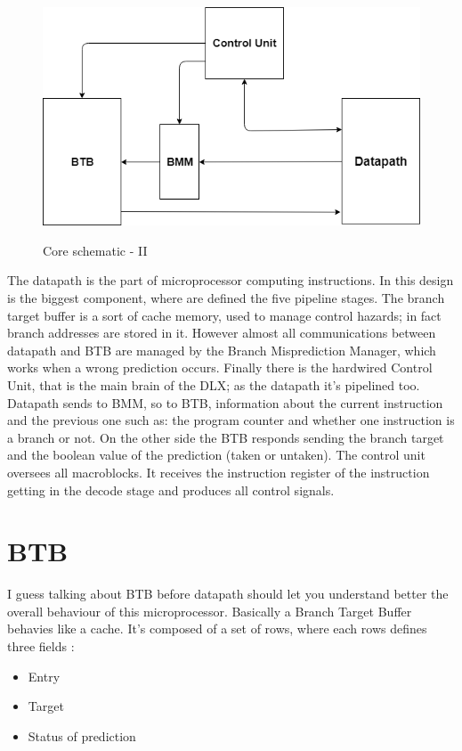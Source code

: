 \begin{figure}[H]
\centering
\includegraphics[scale=.6]{Immagini/07}
\label{02}
\caption{Core schematic - II}
\end{figure}
The datapath is the part of microprocessor computing instructions. In this design is the biggest component, where are defined the five pipeline stages. The branch target buffer is a sort of cache memory, used to manage control hazards; in fact branch addresses are stored in it. However almost all communications between datapath and BTB are managed by the Branch Misprediction Manager, which works when a wrong prediction occurs. Finally there is the hardwired Control Unit, that is the main brain of the DLX; as the datapath it's pipelined too.\newline
Datapath sends to BMM, so to BTB, information about the current instruction and the previous one such as: the program counter and whether one instruction is a branch or not. On the other side the BTB responds sending the branch target and the boolean value of the prediction (taken or untaken). The control unit oversees all macroblocks. It receives the instruction register of the instruction getting in the decode stage and produces all control signals.

\section{BTB}

I guess talking about BTB before datapath should let you understand better the overall behaviour of this microprocessor. Basically a Branch Target Buffer behavies like a cache. It's composed of a set of rows, where each rows defines three fields :
\begin{itemize}
\item Entry
\item Target
\item Status of prediction
\end{itemize}

